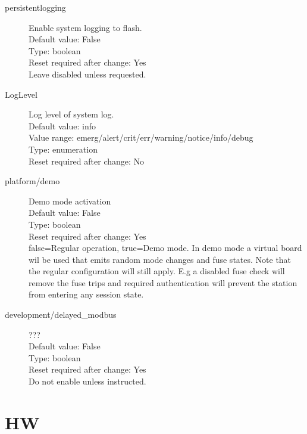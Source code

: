 \begin{description}
\item[persistentlogging] Enable system logging to flash.\\
  Default value: False\\
  Type: boolean\\
  Reset required after change: Yes\\
  Leave disabled unless requested.\\

\item[LogLevel] Log level of system log.\\
  Default value: info\\
  Value range: emerg/alert/crit/err/warning/notice/info/debug\\
  Type: enumeration\\
  Reset required after change: No\\

\item[platform/demo] Demo mode activation\\
  Default value: False\\
  Type: boolean\\
  Reset required after change: Yes\\
  false=Regular operation, true=Demo mode. In demo mode a virtual board wil be used that emits random mode changes and fuse states. Note that the regular configuration will still apply. E.g a disabled fuse check will remove the fuse trips and required authentication will prevent the station from entering any session state.\\

\item[development/delayed\_modbus] ???\\
  Default value: False\\
  Type: boolean\\
  Reset required after change: Yes\\
  Do not enable unless instructed.\\

\end{description}
\pagebreak\section{HW}

